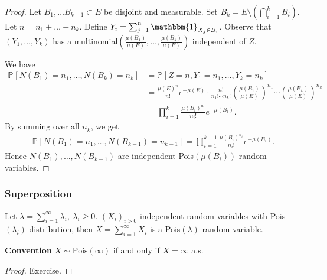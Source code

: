 \begin{proof}
	Let $B_1, \ldots B_{k-1} \subset E$ be disjoint and measurable. Set $B_k = E \setminus \left( \bigcap_{i=1}^{k}B_i \right)$. Let $n=n_1+ \ldots + n_k$. Define $Y_i = \sum_{j=1}^{n} \mathbbm{1}_{X_j \in B_i}$. Observe that $(Y_1,\ldots , Y_k)$ has a multinomial$(\frac{\mu (B_1)}{\mu(E)},\ldots , \frac{\mu (B_k)}{\mu (E)})$ independent of $Z$.

We have 
\begin{align}
	\mathbb{P}_{} \left[ N(B_1)=n_1, \ldots , N(B_k)=n_k \right] &=\mathbb{P}_{} \left[ Z=n, Y_1=n_1,\ldots ,Y_k=n_k \right] \\
								     &= \frac{\mu (E)^{n}}{n!}e^{-\mu (E)} \cdot \frac{n!}{n_1! \cdots n_k!} \left( \frac{\mu (B_1)}{\mu (E)}\right)^{n_1}\cdots  \left( \frac{\mu (B_k)}{\mu (E)}\right)^{n_k} \\
								     &= \prod_{i=1}^{k}\frac{\mu (B_i)^{n_i}}{n_i!}e^{-\mu (B_i)}.
\end{align}
By summing over all $n_k$, we get 
\begin{align}
	\mathbb{P}_{} \left[ N(B_1)=n_1,\ldots , N(B_{k-1})=n_{k-1} \right] = \prod_{i=1}^{k-1}\frac{\mu (B_i)^{n_i}}{n_i!}e^{-\mu (B_i)}.
\end{align}
Hence $N(B_1),\ldots , N(B_{k-1})$ are independent Pois$(\mu (B_i))$ random variables.
\end{proof}


\subsubsection{Superposition}
\begin{lemma}[]
	Let $\lambda = \sum_{i=1}^{\infty} \lambda_i,\ \lambda_i\geq 0$. $(X_i)_{i> 0}$ independent random variables with Pois$(\lambda_i)$ distribution, then $X = \sum_{i=1}^{\infty} X_i$ is a Pois$(\lambda)$ random variable.
\end{lemma}
\textbf{Convention} $X \sim \textrm{Pois}(\infty)$ if and only if $X=\infty $ a.s.
\begin{proof}
	Exercise.
\end{proof}



